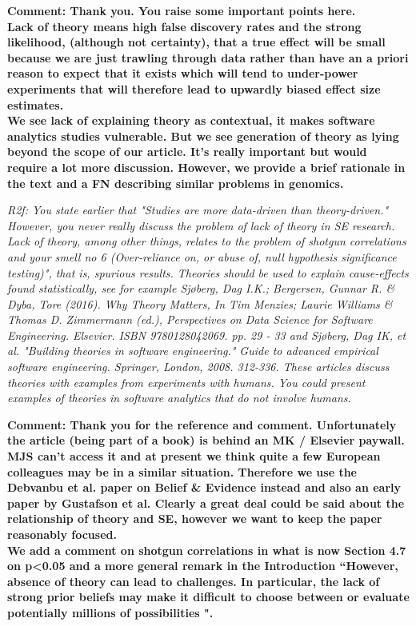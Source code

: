 \documentclass[preprint,10pt]{elsarticle}
\begin{document}
{\bf Comment: Thank you.  You raise some important points here.  \\
Lack of theory means high false discovery rates and the strong likelihood, (although not certainty), that a true effect will be small because we are just trawling through data rather than have an a priori reason to expect that it exists which will tend to under-power experiments that will therefore lead to upwardly biased effect size estimates.\\
We see lack of explaining theory as contextual, it makes software analytics studies vulnerable.  But we see generation of theory as lying beyond the scope of our article.  It's really important but would require a lot more discussion.
However, we provide a brief rationale in the text and a FN describing similar problems in genomics. 
}

{\em
R2f:
You state earlier that "Studies are more data-driven than theory-driven." However, you never really discuss the problem of lack of theory in SE research. Lack of theory, among other things, relates to the problem of shotgun correlations and your smell no 6 (Over-reliance on, or abuse of, null hypothesis significance testing)", that is, spurious results. Theories should be used to explain cause-effects found statistically, see for example Sjøberg, Dag I.K.; Bergersen, Gunnar R. & Dyba, Tore (2016). Why Theory Matters, In Tim Menzies; Laurie Williams & Thomas D. Zimmermann (ed.), Perspectives on Data Science for Software Engineering.  Elsevier.  ISBN 9780128042069.  pp. 29 - 33 and Sjøberg, Dag IK, et al. "Building theories in software engineering." Guide to advanced empirical software engineering. Springer, London, 2008. 312-336. These articles discuss theories with examples from experiments with humans. You could present examples of theories in software analytics that do not involve humans.
}

{\bf Comment: Thank you for the reference and comment. Unfortunately the article (being part of a book) is behind an MK / Elsevier paywall.  MJS can't access it and at present we think quite a few European colleagues may be in a similar situation.  Therefore we use the Debvanbu et al. paper on Belief \& Evidence instead and also an early paper by Gustafson et al.  Clearly a great deal could be said about the relationship of theory and SE, however we want to keep the paper reasonably focused.\\
We add a comment on shotgun correlations in what is now Section 4.7 on p<0.05 and a more general remark in the Introduction ``However, absence of theory can lead to challenges.  In particular, the lack of strong prior beliefs may make it difficult to choose between or evaluate potentially millions of possibilities \cite{Gust93,Deva16}".}
\end{document}

